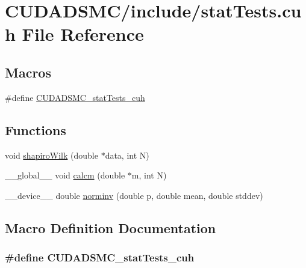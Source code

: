 \hypertarget{stat_tests_8cuh}{\section{C\+U\+D\+A\+D\+S\+M\+C/include/stat\+Tests.cuh File Reference}
\label{stat_tests_8cuh}
}
\subsection*{Macros}
\begin{DoxyCompactItemize}
\item 
\#define \hyperlink{stat_tests_8cuh_a203484b1c0041739c7a24c22674c4acb}{C\+U\+D\+A\+D\+S\+M\+C\+\_\+stat\+Tests\+\_\+cuh}
\end{DoxyCompactItemize}
\subsection*{Functions}
\begin{DoxyCompactItemize}
\item 
void \hyperlink{stat_tests_8cuh_afc94727e7671ab6a4cbabe4df1cea728}{shapiro\+Wilk} (double $\ast$data, int N)
\item 
\+\_\+\+\_\+global\+\_\+\+\_\+ void \hyperlink{stat_tests_8cuh_a5457537b2d39e8697b36e7e7643b7880}{calcm} (double $\ast$m, int N)
\item 
\+\_\+\+\_\+device\+\_\+\+\_\+ double \hyperlink{stat_tests_8cuh_ada930a3764e7b76382128b90a7f9d7a7}{norminv} (double p, double mean, double stddev)
\end{DoxyCompactItemize}


\subsection{Macro Definition Documentation}
\hypertarget{stat_tests_8cuh_a203484b1c0041739c7a24c22674c4acb}{
\subsubsection[{C\+U\+D\+A\+D\+S\+M\+C\+\_\+stat\+Tests\+\_\+cuh}]{\setlength{\rightskip}{0pt plus 5cm}\#define C\+U\+D\+A\+D\+S\+M\+C\+\_\+stat\+Tests\+\_\+cuh}}\label{stat_tests_8cuh_a203484b1c0041739c7a24c22674c4acb}


